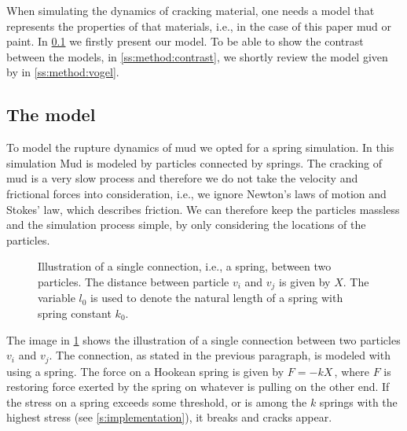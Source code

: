 
When simulating the dynamics of cracking material, one needs a model that represents the properties of that materials, i.e., in the case of this paper mud or paint. In \cref{ss:method:model} we firstly present our model. To be able to show the contrast between the models, in \cref{ss:method:contrast}, we shortly review the model given by \citeauthor{vogel2005studies2} in \cref{ss:method:vogel}.

\subsection{The model}\label{ss:method:model}

To model the rupture dynamics of mud we opted for a spring simulation. In this simulation Mud is modeled by particles connected by springs. The cracking of mud is a very slow process and therefore we do not take the velocity and frictional forces into consideration, i.e., we ignore Newton's laws of motion and Stokes' law, which describes friction. We can therefore keep the particles massless and the simulation process simple, by only considering the locations of the particles. 

\begin{figure}
	\centering
	\singleSpring
	\caption{Illustration of a single connection, i.e., a spring, between two particles. The distance between particle $v_i$ and $v_j$ is given by $X$. The variable $l_0$ is used to denote the natural length of a spring with spring constant $k_0$.}
	\label{fig:method:spring}
\end{figure}

The image in \cref{fig:method:spring} shows the illustration of a single connection between two particles $v_i$ and $v_j$. The connection, as stated in the previous paragraph, is modeled with using a spring. The force on a Hookean spring is given by $F = -k X\,$, where $F$ is restoring force exerted by the spring on whatever is pulling on the other end. If the stress on a spring exceeds some threshold, or is among the $k$ springs with the highest stress (see \cref{s:implementation}), it breaks and cracks appear.


